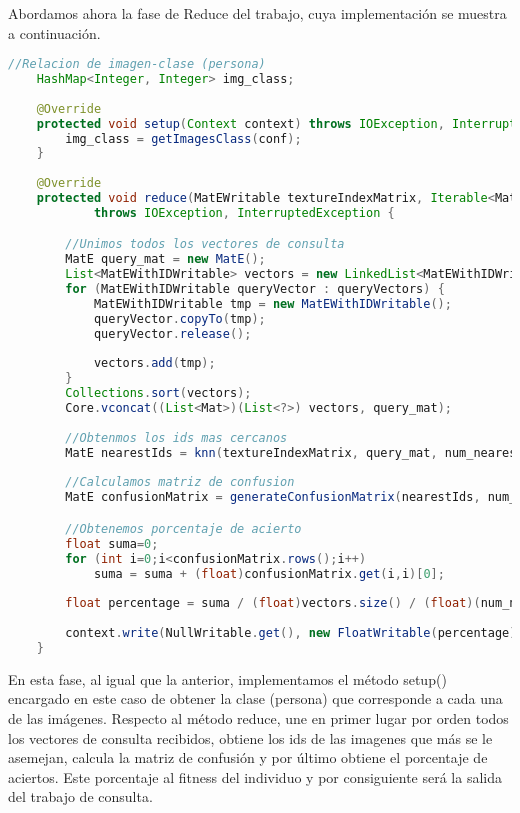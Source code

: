 Abordamos ahora la fase de Reduce del trabajo, cuya implementación se muestra a continuación.

 \begin{lstlisting}[language=Java]
	//Relacion de imagen-clase (persona)
	HashMap<Integer, Integer> img_class;
	
	@Override
	protected void setup(Context context) throws IOException, InterruptedException {
		img_class = getImagesClass(conf);
	}
	
	@Override
	protected void reduce(MatEWritable textureIndexMatrix, Iterable<MatEWithIDWritable> queryVectors, Context context)
			throws IOException, InterruptedException {

		//Unimos todos los vectores de consulta
		MatE query_mat = new MatE();
		List<MatEWithIDWritable> vectors = new LinkedList<MatEWithIDWritable>();
		for (MatEWithIDWritable queryVector : queryVectors) {
			MatEWithIDWritable tmp = new MatEWithIDWritable();
			queryVector.copyTo(tmp);
			queryVector.release();
			
			vectors.add(tmp);
		}
		Collections.sort(vectors);
		Core.vconcat((List<Mat>)(List<?>) vectors, query_mat);
		
		//Obtenmos los ids mas cercanos
		MatE nearestIds = knn(textureIndexMatrix, query_mat, num_nearest);
		
		//Calculamos matriz de confusion		
		MatE confusionMatrix = generateConfusionMatrix(nearestIds, num_nearest);

		//Obtenemos porcentaje de acierto
		float suma=0;
		for (int i=0;i<confusionMatrix.rows();i++)
			suma = suma + (float)confusionMatrix.get(i,i)[0];
		
		float percentage = suma / (float)vectors.size() / (float)(num_nearest - 1);
		
		context.write(NullWritable.get(), new FloatWritable(percentage));
	}
\end{lstlisting}

En esta fase, al igual que la anterior, implementamos el método setup() encargado en este caso de obtener la clase (persona) que corresponde a cada una de las imágenes. Respecto al método reduce, une en primer lugar por orden todos los vectores de consulta recibidos, obtiene los ids de las imagenes que m\'as se le asemejan, calcula la matriz de confusi\'on y por \'ultimo obtiene el porcentaje de aciertos. Este porcentaje al fitness del individuo y por consiguiente ser\'a la salida del trabajo de consulta.













